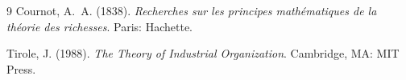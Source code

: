 \documentclass[11pt]{article}
\theoremstyle{definition}
\begin{document}
\begin{thebibliography}{9}
Cournot, A.~A. (1838). \emph{Recherches sur les principes math\'ematiques de la th\'eorie des richesses}. Paris: Hachette.

Tirole, J. (1988). \emph{The Theory of Industrial Organization}. Cambridge, MA: MIT Press.
\end{thebibliography}
\end{document}
